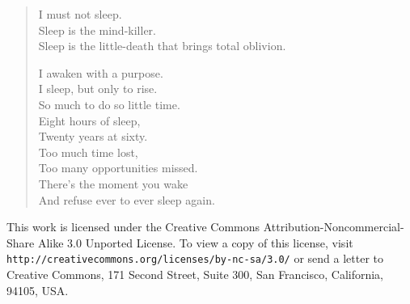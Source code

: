 \documentclass[11pt,letterpaper]{article}
\begin{document}
\begin{verse}
I must not sleep.\\
Sleep is the mind-killer.\\
Sleep is the little-death that brings total oblivion.

I awaken with a purpose.\\
I sleep, but only to rise.\\
So much to do so little time.\\
Eight hours of sleep,\\
Twenty years at sixty.\\
Too much time lost,\\
Too many opportunities missed.\\
There's the moment you wake\\
And refuse ever to ever sleep again.
\end{verse}

\begin{center}
\begin{boxedminipage}{0.65\textwidth}
  This work is licensed under the Creative Commons Attribution-Noncommercial-Share Alike 3.0 Unported License. To view a copy of this license, visit \texttt{http://creativecommons.org/licenses/by-nc-sa/3.0/} or send a letter to Creative Commons, 171 Second Street, Suite 300, San Francisco, California, 94105, USA.
\end{boxedminipage}
\end{center}
\end{document}

